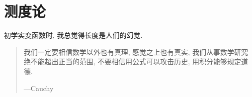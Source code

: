 \chapter{测度论}

初学实变函数时, 我总觉得长度是人们的幻觉.

\begin{quote}
    我们一定要相信数学以外也有真理, 感觉之上也有真实, 我们从事数学研究绝不能超出正当的范围,
    不要相信用公式可以攻击历史, 用积分能够规定道德.

    \hfill ---Cauchy
\end{quote}
